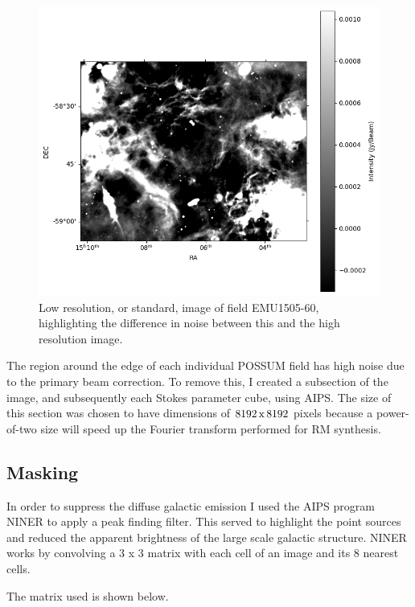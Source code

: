 \begin{figure}

\includegraphics[width=1\linewidth]{Thesis_Template/Figures/lores_crop.png}
\caption[Low resolution, or standard, image of field EMU1505-60.]{Low resolution, or standard, image of field EMU1505-60, highlighting the difference in noise between this and the high resolution image.}
\label{fig: low_res}
\end{figure}


The region around the edge of each individual POSSUM field has high noise due to the primary beam correction. To remove this, I created a subsection of the image, and subsequently each Stokes parameter cube, using AIPS. The size of this section was chosen to have dimensions of $8192{\rm \, x\,}8192$ pixels because a power-of-two size will speed up the Fourier transform performed for RM synthesis.


\subsection{Masking}

In order to suppress the diffuse galactic emission I used the AIPS program NINER to apply a peak finding filter. This served to highlight the point sources and reduced the apparent brightness of the large scale galactic structure. NINER works by convolving a 3 x 3 matrix with each cell of an image and its 8 nearest cells. 

The matrix used is shown below.


